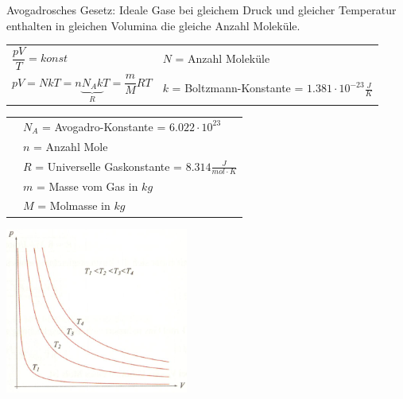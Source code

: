 		\begin{minipage}{13cm}
			\begin{flushleft}
				Avogadrosches Gesetz: Ideale Gase bei gleichem Druck und gleicher Temperatur enthalten in gleichen Volumina die gleiche Anzahl Moleküle.
			\end{flushleft}
			\renewcommand{\arraystretch}{2.5}
			\begin{tabular}{ p{5cm} | p{7cm}}
				$\dfrac{pV}{T} = konst$	&	$N$ = Anzahl Moleküle\\
				$pV = N k T = n \underbrace{N_A k}_R T = \dfrac{m}{M} R T$	&	$k$ = Boltzmann-Konstante = $1.381 \cdot 10^{-23} \frac{J}{K}$\\
			\end{tabular}
			\renewcommand{\arraystretch}{1.5}
			\begin{tabular}{ p{5cm} | p{7cm} }
				& $N_A$ = Avogadro-Konstante = $6.022 \cdot 10^{23}$\\
				& $n$ = Anzahl Mole\\
				& $R$ = Universelle Gaskonstante = $8.314 \frac{J}{mol \cdot K}$\\
				& $m$ = Masse vom Gas in $kg$\\
				& $M$ = Molmasse in $kg$\\
			\end{tabular} 
			\renewcommand{\arraystretch}{1}
		\end{minipage}
		\begin{minipage}{10cm}
			\vspace{-\ht\strutbox}\includegraphics[width=6cm]{./bilder/Isotherme.png}
		\end{minipage}
		\newline
